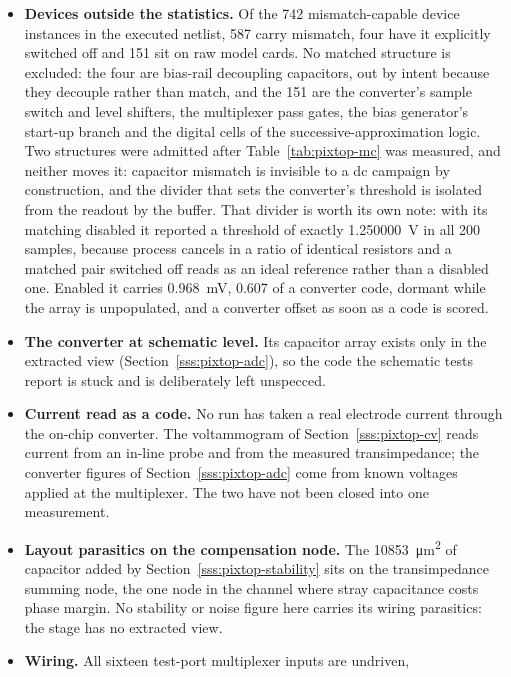 \begin{itemize}[nosep]
  \item \textbf{Devices outside the statistics.} Of the 742 mismatch-capable
    device instances in the executed netlist, 587 carry mismatch, four have it
    explicitly switched off and 151 sit on raw model cards. No matched structure
    is excluded: the four are bias-rail decoupling capacitors, out by intent
    because they decouple rather than match, and the 151 are the converter's
    sample switch and level shifters, the multiplexer pass gates, the bias
    generator's start-up branch and the digital cells of the
    successive-approximation logic. Two structures were admitted after
    Table~\ref{tab:pixtop-mc} was measured, and neither moves it: capacitor
    mismatch is invisible to a dc campaign by construction, and the divider that
    sets the converter's threshold is isolated from the readout by the
    buffer. That divider is worth its own note: with its matching disabled it
    reported a threshold of exactly \SI{1.250000}{\volt} in all 200 samples,
    because process cancels in a ratio of identical resistors and a matched pair
    switched off reads as an ideal reference rather than a disabled one. Enabled
    it carries \SI{0.968}{\milli\volt}, \num{0.607} of a converter code,
    dormant while the array is unpopulated, and a converter offset as soon as a
    code is scored.
  \item \textbf{The converter at schematic level.} Its capacitor array exists
    only in the extracted view (Section~\ref{sss:pixtop-adc}), so the code the
    schematic tests report is stuck and is deliberately left unspecced.
  \item \textbf{Current read as a code.} No run has taken a real electrode
    current through the on-chip converter. The voltammogram of
    Section~\ref{sss:pixtop-cv} reads current from an in-line probe and from
    the measured transimpedance; the converter figures of
    Section~\ref{sss:pixtop-adc} come from known voltages applied at the
    multiplexer. The two have not been closed into one measurement.
  \item \textbf{Layout parasitics on the compensation node.} The
    \SI{10853}{\micro\meter\squared} of capacitor added by
    Section~\ref{sss:pixtop-stability} sits on the transimpedance summing node,
    the one node in the channel where stray capacitance costs phase margin. No
    stability or noise figure here carries its wiring parasitics: the stage has
    no extracted view.
  \item \textbf{Wiring.} All sixteen test-port multiplexer inputs are undriven,

\end{itemize}
